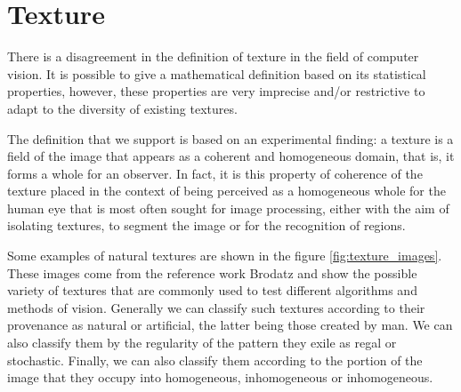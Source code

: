 \section{Texture}
There is a disagreement in the definition of texture in the field of computer vision. It is possible to give a mathematical definition based on its statistical properties, however, these properties are very imprecise and/or restrictive to adapt to the diversity of existing textures.

The definition that we support is based on an experimental finding: a texture is a field of the image that appears as a coherent and homogeneous domain, that is, it forms a whole for an observer. In fact, it is this property of coherence of the texture placed in the context of being perceived as a homogeneous whole for the human eye that is most often sought for image processing, either with the aim of isolating textures, to segment the image or for the recognition of regions.

Some examples of natural textures are shown in the figure \ref{fig:texture_images}. These images come from the reference work Brodatz and show the possible variety of textures that are commonly used to test different algorithms and methods of vision. Generally we can classify such textures according to their provenance as natural or artificial, the latter being those created by man. We can also classify them by the regularity of the pattern they exile as regal or stochastic. Finally, we can also classify them according to the portion of the image that they occupy into homogeneous, inhomogeneous or inhomogeneous.


